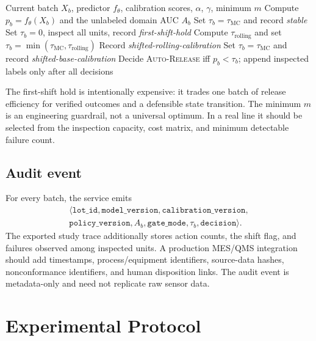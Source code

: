 \documentclass[journal]{IEEEtran}
\begin{document}
\begin{algorithm}[t]
\caption{DTCG gate policy.}
\label{alg:dtcg}
\footnotesize
\begin{algorithmic}[1]
\Require Current batch $X_b$, predictor $f_\theta$, calibration scores, $\alpha$, $\gamma$, minimum $m$
\State Compute $p_b=f_\theta(X_b)$ and the unlabeled domain AUC $A_b$
    \State Set $\tau_b=\tau_{\mathrm{MC}}$ and record \textit{stable}
    \State Set $\tau_b=0$, inspect all units, record \textit{first-shift-hold}
    \State Compute $\tau_{\mathrm{rolling}}$ and set $\tau_b=\min(\tau_{\mathrm{MC}},\tau_{\mathrm{rolling}})$
    \State Record \textit{shifted-rolling-calibration}
\Else
    \State Set $\tau_b=\tau_{\mathrm{MC}}$ and record \textit{shifted-base-calibration}
\EndIf
\State Decide \textsc{Auto-Release} iff $p_b<\tau_b$; append inspected labels only after all decisions
\end{algorithmic}
\end{algorithm}

The first-shift hold is intentionally expensive: it trades one batch of release efficiency for verified outcomes and a defensible state transition. The minimum $m$ is an engineering guardrail, not a universal optimum. In a real line it should be selected from the inspection capacity, cost matrix, and minimum detectable failure count.

\subsection{Audit event}
For every batch, the service emits
\begin{equation*}
\begin{gathered}
\langle\texttt{lot\_id},\texttt{model\_version},\texttt{calibration\_version},\\
\texttt{policy\_version},A_b,\texttt{gate\_mode},\tau_b,\texttt{decision}\rangle.
\end{gathered}
\end{equation*}
The exported study trace additionally stores action counts, the shift flag, and failures observed among inspected units. A production MES/QMS integration should add timestamps, process/equipment identifiers, source-data hashes, nonconformance identifiers, and human disposition links. The audit event is metadata-only and need not replicate raw sensor data.

\section{Experimental Protocol}
\label{sec:experiments}
\end{document}
